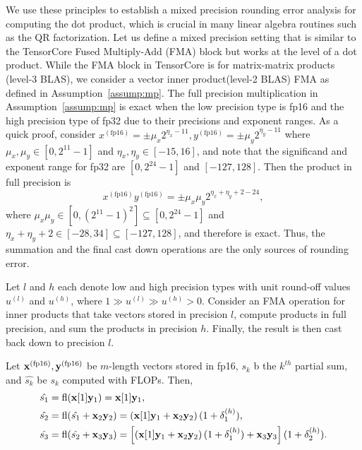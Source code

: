 We use these principles to establish a mixed precision rounding error analysis for computing the dot product, which is crucial in many linear algebra routines such as the QR factorization.
Let us define a mixed precision setting that is similar to the TensorCore Fused Multiply-Add (FMA) block but works at the level of a dot product. 
While the FMA block in TensorCore is for matrix-matrix products (level-3 BLAS), we consider a vector inner product(level-2 BLAS) FMA as defined in Assumption~\ref{assump:mp}.
The full precision multiplication in Assumption~\ref{assump:mp} is exact when the low precision type is fp16 and the high precision type of fp32 due to their precisions and exponent ranges. 
As a quick proof, consider $x^{(\text{fp16})} = \pm\mu_x2^{\eta_x -11},y^{(\text{fp16})} = \pm\mu_y2^{\eta_y -11}$ where $\mu_x,\mu_y\in[0,2^{11}-1]$ and $\eta_x,\eta_y\in[-15,16]$, and note that the significand and exponent range for fp32 are $[0, 2^{24}-1]$ and $[-127,128]$.
Then the product in full precision is
$$
x^{(\text{fp16})}y^{(\text{fp16})} = \pm\mu_x\mu_y 2^{\eta_x+\eta_y+2-24},
$$
where  $\mu_x\mu_y \in[0,(2^{11}-1)^2] \subseteq [0,2^{24}-1]$ and $\eta_x+\eta_y +2\in[-28,34]\subseteq[-127,128]$, and therefore is exact.
Thus, the summation and the final cast down operations are the only sources of rounding error.
\begin{assump}
	\label{assump:mp}
	Let $l$ and $h$ each denote low and high precision types with unit round-off values $u^{(l)}$ and $u^{(h)}$, where $1 \gg u^{(l)} \gg u^{(h)} >0$.
	Consider an FMA operation for inner products that take vectors stored in precision $l$, compute products in full precision, and sum the products in precision $h$. 
	Finally, the result is then cast back down to precision $l$.
\end{assump}
\par
Let $\mathbf{x}^{(\text{fp16})},\mathbf{y}^{(\text{fp16})}$ be $m$-length vectors stored in fp16, $s_k$ b the $k^{th}$ partial sum, and $\hat{s_k}$ be $s_k$ computed with FLOPs.
Then,
\begin{align*}
\hat{s_1} &= \mathrm{fl} (\mathbf{x}[1]\mathbf{y}_1) = \mathbf{x}[1]\mathbf{y}_1,\\
\hat{s_2} &= \mathrm{fl}(\hat{s_1} + \mathbf{x}_2\mathbf{y}_2) = \left(\mathbf{x}[1]\mathbf{y}_1+ \mathbf{x}_2\mathbf{y}_2\right)(1+\delta_{1}^{(h)}),\\
\hat{s_3} &= \mathrm{fl}(\hat{s_2}+\mathbf{x}_3\mathbf{y}_3) = \left[\left(\mathbf{x}[1]\mathbf{y}_1 + \mathbf{x}_2\mathbf{y}_2\right)(1+\delta_{1}^{(h)})  + \mathbf{x}_3\mathbf{y}_3\right](1+\delta_{2}^{(h)}).
\end{align*}
